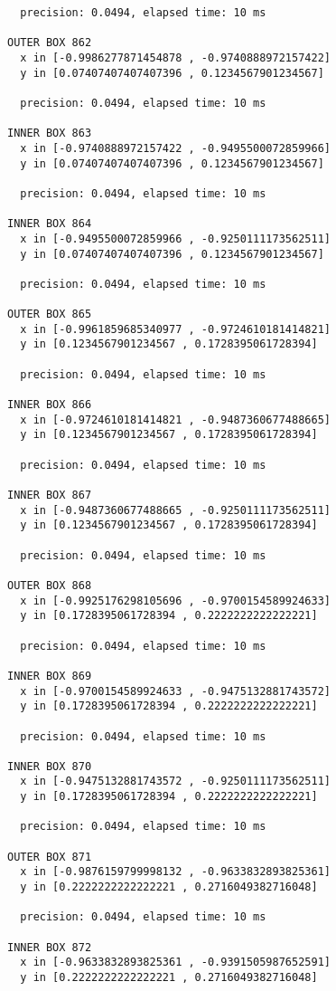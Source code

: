 \begin{verbatim}
  precision: 0.0494, elapsed time: 10 ms

OUTER BOX 862
  x in [-0.9986277871454878 , -0.9740888972157422]
  y in [0.07407407407407396 , 0.1234567901234567]

  precision: 0.0494, elapsed time: 10 ms

INNER BOX 863
  x in [-0.9740888972157422 , -0.9495500072859966]
  y in [0.07407407407407396 , 0.1234567901234567]

  precision: 0.0494, elapsed time: 10 ms

INNER BOX 864
  x in [-0.9495500072859966 , -0.9250111173562511]
  y in [0.07407407407407396 , 0.1234567901234567]

  precision: 0.0494, elapsed time: 10 ms

OUTER BOX 865
  x in [-0.9961859685340977 , -0.9724610181414821]
  y in [0.1234567901234567 , 0.1728395061728394]

  precision: 0.0494, elapsed time: 10 ms

INNER BOX 866
  x in [-0.9724610181414821 , -0.9487360677488665]
  y in [0.1234567901234567 , 0.1728395061728394]

  precision: 0.0494, elapsed time: 10 ms

INNER BOX 867
  x in [-0.9487360677488665 , -0.9250111173562511]
  y in [0.1234567901234567 , 0.1728395061728394]

  precision: 0.0494, elapsed time: 10 ms

OUTER BOX 868
  x in [-0.9925176298105696 , -0.9700154589924633]
  y in [0.1728395061728394 , 0.2222222222222221]

  precision: 0.0494, elapsed time: 10 ms

INNER BOX 869
  x in [-0.9700154589924633 , -0.9475132881743572]
  y in [0.1728395061728394 , 0.2222222222222221]

  precision: 0.0494, elapsed time: 10 ms

INNER BOX 870
  x in [-0.9475132881743572 , -0.9250111173562511]
  y in [0.1728395061728394 , 0.2222222222222221]

  precision: 0.0494, elapsed time: 10 ms

OUTER BOX 871
  x in [-0.9876159799998132 , -0.9633832893825361]
  y in [0.2222222222222221 , 0.2716049382716048]

  precision: 0.0494, elapsed time: 10 ms

INNER BOX 872
  x in [-0.9633832893825361 , -0.9391505987652591]
  y in [0.2222222222222221 , 0.2716049382716048]


\end{verbatim}

